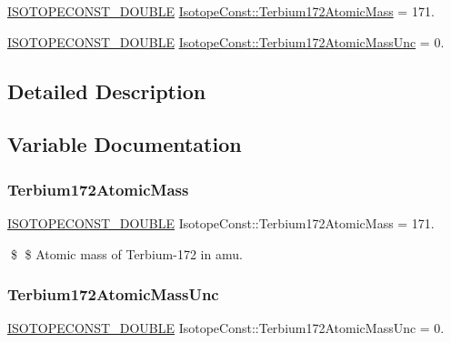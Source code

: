 \begin{DoxyCompactItemize}
\item 
\mbox{\hyperlink{group___isotope_const-_macros_ga8f45a7272ce02c0b4c65c44636ed719a}{I\+S\+O\+T\+O\+P\+E\+C\+O\+N\+S\+T\+\_\+\+D\+O\+U\+B\+LE}} \mbox{\hyperlink{group___isotope_const-_terbium-_tb172_ga9c96697a2b631773658976444ffdfb3f}{Isotope\+Const\+::\+Terbium172\+Atomic\+Mass}} = 171.
\item 
\mbox{\hyperlink{group___isotope_const-_macros_ga8f45a7272ce02c0b4c65c44636ed719a}{I\+S\+O\+T\+O\+P\+E\+C\+O\+N\+S\+T\+\_\+\+D\+O\+U\+B\+LE}} \mbox{\hyperlink{group___isotope_const-_terbium-_tb172_gabd30978b1d3ba18935e1a5afcccb2dab}{Isotope\+Const\+::\+Terbium172\+Atomic\+Mass\+Unc}} = 0.
\end{DoxyCompactItemize}


\subsection{Detailed Description}


\subsection{Variable Documentation}
\mbox{\label{group___isotope_const-_terbium-_tb172_ga9c96697a2b631773658976444ffdfb3f}} 
\subsubsection{\texorpdfstring{Terbium172\+Atomic\+Mass}{Terbium172AtomicMass}}
{\footnotesize\ttfamily \mbox{\hyperlink{group___isotope_const-_macros_ga8f45a7272ce02c0b4c65c44636ed719a}{I\+S\+O\+T\+O\+P\+E\+C\+O\+N\+S\+T\+\_\+\+D\+O\+U\+B\+LE}} Isotope\+Const\+::\+Terbium172\+Atomic\+Mass = 171.}

\$ \$ Atomic mass of Terbium-\/172 in amu. \mbox{\label{group___isotope_const-_terbium-_tb172_gabd30978b1d3ba18935e1a5afcccb2dab}} 
\subsubsection{\texorpdfstring{Terbium172\+Atomic\+Mass\+Unc}{Terbium172AtomicMassUnc}}
{\footnotesize\ttfamily \mbox{\hyperlink{group___isotope_const-_macros_ga8f45a7272ce02c0b4c65c44636ed719a}{I\+S\+O\+T\+O\+P\+E\+C\+O\+N\+S\+T\+\_\+\+D\+O\+U\+B\+LE}} Isotope\+Const\+::\+Terbium172\+Atomic\+Mass\+Unc = 0.}

